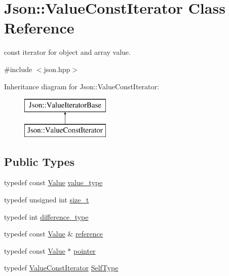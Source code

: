 \hypertarget{class_json_1_1_value_const_iterator}{\section{Json\-:\-:Value\-Const\-Iterator Class Reference}
\label{class_json_1_1_value_const_iterator}
}


const iterator for object and array value.  




{\ttfamily \#include $<$json.\-hpp$>$}

Inheritance diagram for Json\-:\-:Value\-Const\-Iterator\-:\begin{figure}[H]
\begin{center}
\leavevmode
\includegraphics[height=2.000000cm]{class_json_1_1_value_const_iterator}
\end{center}
\end{figure}
\subsection*{Public Types}
\begin{DoxyCompactItemize}
\item 
typedef const \hyperlink{class_json_1_1_value}{Value} \hyperlink{class_json_1_1_value_const_iterator_aa5f1707dcef4bfe73e23ddc14dbe760d}{value\-\_\-type}
\item 
typedef unsigned int \hyperlink{class_json_1_1_value_const_iterator_a8685219d214dbd2b763357ae94fb0f27}{size\-\_\-t}
\item 
typedef int \hyperlink{class_json_1_1_value_const_iterator_a32b36aa9d76e2b48ca74fb6e1979a95a}{difference\-\_\-type}
\item 
typedef const \hyperlink{class_json_1_1_value}{Value} \& \hyperlink{class_json_1_1_value_const_iterator_aa9b05c6a37cd352ea1ee6e13b816f709}{reference}
\item 
typedef const \hyperlink{class_json_1_1_value}{Value} $\ast$ \hyperlink{class_json_1_1_value_const_iterator_a400136bd8bc09e9fddec0785fa2cff14}{pointer}
\item 
typedef \hyperlink{class_json_1_1_value_const_iterator}{Value\-Const\-Iterator} \hyperlink{class_json_1_1_value_const_iterator_a0c2e33e7eb5a80dd8709fb28ece83933}{Self\-Type}
\end{DoxyCompactItemize}

